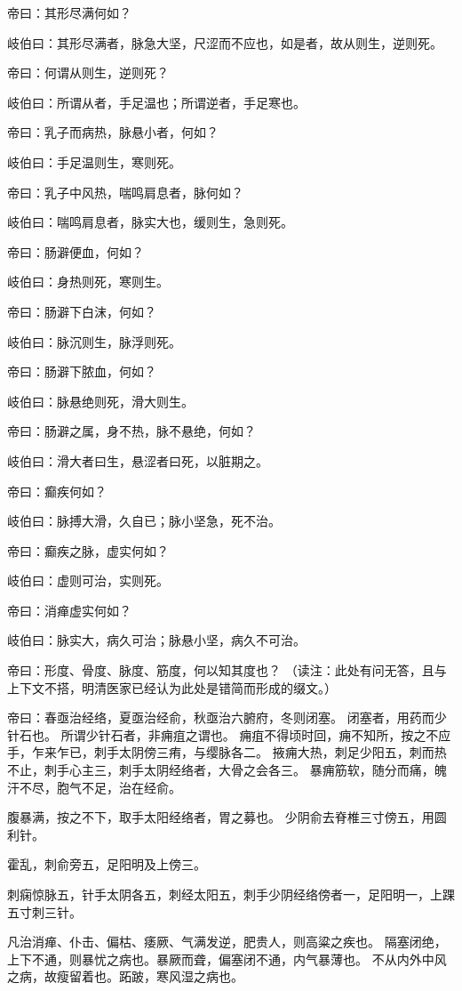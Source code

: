 \documentclass{article}%
\begin{document}
帝曰：其形尽满何如？

岐伯曰：其形尽满者，脉急大坚，尺涩而不应也，如是者，故从则生，逆则死。

帝曰：何谓从则生，逆则死？

岐伯曰：所谓从者，手足温也；所谓逆者，手足寒也。

帝曰：乳子而病热，脉悬小者，何如？

岐伯曰：手足温则生，寒则死。

帝曰：乳子中风热，喘鸣肩息者，脉何如？

岐伯曰：喘鸣肩息者，脉实大也，缓则生，急则死。

帝曰：肠澼便血，何如？

岐伯曰：身热则死，寒则生。

帝曰：肠澼下白沫，何如？

岐伯曰：脉沉则生，脉浮则死。

帝曰：肠澼下脓血，何如？

岐伯曰：脉悬绝则死，滑大则生。

帝曰：肠澼之属，身不热，脉不悬绝，何如？

岐伯曰：滑大者曰生，悬涩者曰死，以脏期之。

帝曰：癫疾何如？

岐伯曰：脉搏大滑，久自已；脉小坚急，死不治。

帝曰：癫疾之脉，虚实何如？

岐伯曰：虚则可治，实则死。

帝曰：消瘅虚实何如？

岐伯曰：脉实大，病久可治；脉悬小坚，病久不可治。

帝曰：形度、骨度、脉度、筋度，何以知其度也？
（读注：此处有问无答，且与上下文不搭，明清医家已经认为此处是错简而形成的缀文。）

帝曰：春亟治经络，夏亟治经俞，秋亟治六腑府，冬则闭塞。
闭塞者，用药而少针石也。
所谓少针石者，非痈疽之谓也。
痈疽不得顷时回，痈不知所，按之不应手，乍来乍已，刺手太阴傍三痏，与缨脉各二。
掖痈大热，刺足少阳五，刺而热不止，刺手心主三，刺手太阴经络者，大骨之会各三。
暴痈筋软，随分而痛，魄汗不尽，胞气不足，治在经俞。

腹暴满，按之不下，取手太阳经络者，胃之募也。
少阴俞去脊椎三寸傍五，用圆利针。

霍乱，刺俞旁五，足阳明及上傍三。

刺痫惊脉五，针手太阴各五，刺经太阳五，刺手少阴经络傍者一，足阳明一，上踝五寸刺三针。

凡治消瘅、仆击、偏枯、痿厥、气满发逆，肥贵人，则高粱之疾也。
隔塞闭绝，上下不通，则暴忧之病也。暴厥而聋，偏塞闭不通，内气暴薄也。
不从内外中风之病，故瘦留着也。跖跛，寒风湿之病也。
\end{document}
